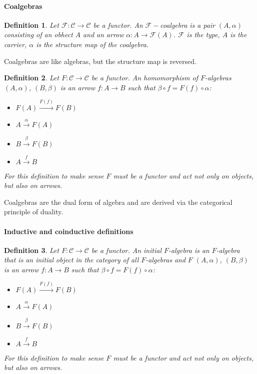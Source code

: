 \documentclass[]{article}
\newtheorem{definition}{Definition}
\begin{document}
\paragraph{Coalgebras}
\begin{definition}
    Let $\mathcal{F}: \mathcal{C} \rightarrow \mathcal{C}$ be a functor. An $\mathcal{F}-$coalgebra is a pair $(A,\alpha)$ consisting of an obhect $A$ and an arrow 
    $\alpha:A\rightarrow \mathcal{F}(A)$. $\mathcal{F}$ is the type, $A$ is the carrier, $\alpha$ is the structure map of the coalgebra.
\end{definition}

Coalgebras are like algebras, but the structure map is reversed.

\begin{definition}
    Let $F: \mathcal{C} \rightarrow \mathcal{C}$ be a functor. 
    An homomorphism of $F$-algebras $(A,\alpha)$, $(B,\beta)$ is an arrow $f:A\rightarrow B$ such that $\beta\circ f = F(f)\circ \alpha$:
    \begin{itemize}
        \item $F(A)\xrightarrow{F(f)}F(B)$
        \item $A\xrightarrow{\alpha}F(A)$
        \item $B\xrightarrow{\beta}F(B)$
        \item $A\xrightarrow{f}B$
    \end{itemize}
    For this definition to make sense $F$ must be a functor and act not only on objects, but also on arrows.
\end{definition}

Coalgebras are the dual form of algebra and are derived via the categorical principle of duality.

\paragraph{Inductive and coinductive definitions}

\begin{definition}
    Let $F: \mathcal{C} \rightarrow \mathcal{C}$ be a functor. 
    An initial $F$-algebra is an $F$-algebra that is an \textit{initial object} in the category of all $F$-algebras and $F$ $(A,\alpha)$, $(B,\beta)$ is an arrow $f:A\rightarrow B$ such that $\beta\circ f = F(f)\circ \alpha$:
    \begin{itemize}
        \item $F(A)\xrightarrow{F(f)}F(B)$
        \item $A\xrightarrow{\alpha}F(A)$
        \item $B\xrightarrow{\beta}F(B)$
        \item $A\xrightarrow{f}B$
    \end{itemize}
    For this definition to make sense $F$ must be a functor and act not only on objects, but also on arrows.
\end{definition}
\end{document}

